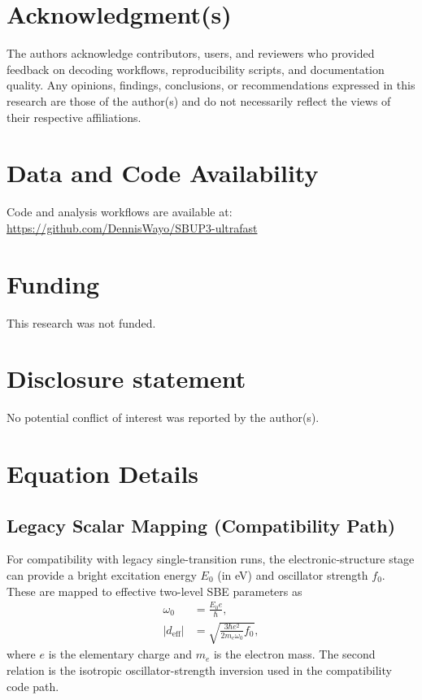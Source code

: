 \documentclass[aps,pra,twocolumn,reprint,superscriptaddress,nofootinbib]{revtex4-2}
\begin{document}
\section*{Acknowledgment(s)}
The authors acknowledge contributors, users, and reviewers who provided feedback on decoding workflows, reproducibility scripts, and documentation quality. Any opinions, findings, conclusions, or recommendations expressed in this research are those of the author(s) and do not necessarily reflect the views of their respective affiliations.


\section*{Data and Code Availability}
Code and analysis workflows are available at: \url{https://github.com/DennisWayo/SBUP3-ultrafast}

\section*{Funding}
This research was not funded.


\section*{Disclosure statement}
No potential conflict of interest was reported by the author(s).


\appendix

\section{Equation Details}\label{sec:appendix_math}
\subsection{Legacy Scalar Mapping (Compatibility Path)}
For compatibility with legacy single-transition runs, the electronic-structure
stage can provide a bright excitation energy $E_0$ (in eV) and oscillator
strength $f_0$. These are mapped to effective two-level SBE parameters as
\begin{align}
\omega_0 &= \frac{E_0 e}{\hbar}, \\
|d_{\mathrm{eff}}| &= \sqrt{\frac{3\hbar e^2}{2m_e\omega_0} f_0},
\end{align}
where $e$ is the elementary charge and $m_e$ is the electron mass. The second
relation is the isotropic oscillator-strength inversion used in the
compatibility code path.
\end{document}
